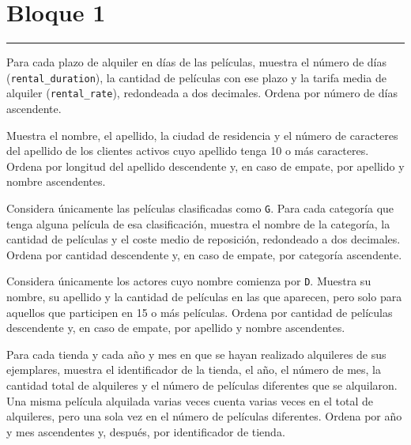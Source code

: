 \documentclass[11pt,a4paper]{article}
\begin{document}
\section*{Bloque 1}\vspace{-3mm}\color{LBcereza}\rule{\textwidth}{0.5pt}\color{LBtexto}
\par{}\par\smallskip Para cada plazo de alquiler en días de las películas, muestra el número de días (\texttt{rental\_duration}), la cantidad de películas con ese plazo y la tarifa media de alquiler (\texttt{rental\_rate}), redondeada a dos decimales. Ordena por número de días ascendente.\par\medskip
{}\par{}\par\smallskip Muestra el nombre, el apellido, la ciudad de residencia y el número de caracteres del apellido de los clientes activos cuyo apellido tenga 10 o más caracteres. Ordena por longitud del apellido descendente y, en caso de empate, por apellido y nombre ascendentes.\par\medskip
{}\par{}\par\smallskip Considera únicamente las películas clasificadas como \texttt{G}. Para cada categoría que tenga alguna película de esa clasificación, muestra el nombre de la categoría, la cantidad de películas y el coste medio de reposición, redondeado a dos decimales. Ordena por cantidad descendente y, en caso de empate, por categoría ascendente.\par\medskip
{}\par{}\par\smallskip Considera únicamente los actores cuyo nombre comienza por \texttt{D}. Muestra su nombre, su apellido y la cantidad de películas en las que aparecen, pero solo para aquellos que participen en 15 o más películas. Ordena por cantidad de películas descendente y, en caso de empate, por apellido y nombre ascendentes.\par\medskip
{}\par{}\par\smallskip Para cada tienda y cada año y mes en que se hayan realizado alquileres de sus ejemplares, muestra el identificador de la tienda, el año, el número de mes, la cantidad total de alquileres y el número de películas diferentes que se alquilaron. Una misma película alquilada varias veces cuenta varias veces en el total de alquileres, pero una sola vez en el número de películas diferentes. Ordena por año y mes ascendentes y, después, por identificador de tienda.\par\medskip
\end{document}
